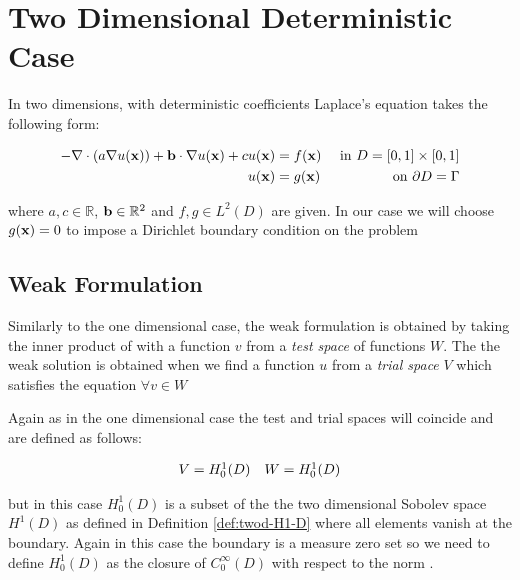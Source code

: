 \chapter{Two Dimensional Deterministic Case}\label{chap:twod-deterministic}

In two dimensions, with deterministic coefficients Laplace's equation takes the
following form:

\begin{equation}\label{eq:two-d-deterministic}
\begin{aligned}
    -\nabla\cdot(a\nabla u(\mathbf{x})) + \mathbf{b} \cdot \nabla u(\mathbf{x}) + c u(\mathbf{x}) &= f(\mathbf{x})
                               &\text{ in } D = [0,1] \times [0,1] \\
    u(\mathbf{x}) &= g(\mathbf{x}) &\text{ on } \partial D = \Gamma
\end{aligned}
\end{equation}

where $a, c \in \mathbb{R}$, $\mathbf{b} \in \mathbb{R}^2$ and $f, g \in L^2(D)$ are
given. In our case we will choose $g(\mathbf{x}) = 0$ to impose a Dirichlet boundary
condition on the problem

\section{Weak Formulation}

Similarly to the one dimensional case, the weak formulation is obtained by
taking the inner product of  with a function $v$
from a \textit{test space} of functions $W$. The the weak solution is obtained
when we find a function $u$ from a \textit{trial space} $V$ which satisfies the
equation $\forall v \in W$

Again as in the one dimensional case the test and trial spaces will coincide
and are defined as follows:

\begin{equation}
    \begin{array}{c c}
        V = H^1_0(D) & W = H^1_0(D)
    \end{array}
\end{equation}

but in this case $H^1_0(D)$ is a subset of the the two dimensional Sobolev
space $H^1(D)$ as defined in Definition \ref{def:twod-H1-D} where all elements
vanish at the boundary. Again in this case the boundary is a measure zero set
so we need to define $H^1_0(D)$ as the closure of $C_0^\infty(D)$ with respect
to the norm .

